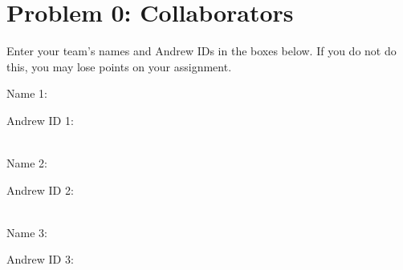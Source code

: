 \documentclass[12pt]{article}
\begin{document}
\section*{Problem 0: Collaborators}
Enter your team's names and Andrew IDs in the boxes below.  If you do not do this, you may lose points on your assignment.

Name 1: \begin{tcolorbox}[fit,height=1cm, width=5cm, blank, borderline={1pt}{1pt},nobeforeafter]
    \begin{center}
    \vspace{3mm}
    \large{}
    \end{center}
\end{tcolorbox}
Andrew ID 1: \begin{tcolorbox}[fit,height=1cm, width=5cm, blank, borderline={1pt}{1pt},nobeforeafter]
    \begin{center}
    \vspace{3mm}
    \large{}
    \end{center}
\end{tcolorbox}
    \\
Name 2: \begin{tcolorbox}[fit,height=1cm, width=5cm, blank, borderline={1pt}{1pt},nobeforeafter]
    \begin{center}
    \vspace{3mm}
    \large{}
    \end{center}
\end{tcolorbox}
Andrew ID 2: \begin{tcolorbox}[fit,height=1cm, width=5cm, blank, borderline={1pt}{1pt},nobeforeafter]
    \begin{center}
    \vspace{3mm}
    \large{}
    \end{center}
\end{tcolorbox} \\
Name 3: \begin{tcolorbox}[fit,height=1cm, width=5cm, blank, borderline={1pt}{1pt},nobeforeafter]
    \begin{center}
    \vspace{3mm}
    \large{}
    \end{center}
\end{tcolorbox}
Andrew ID 3: \begin{tcolorbox}[fit,height=1cm, width=5cm, blank, borderline={1pt}{1pt},nobeforeafter]
    \begin{center}
    \vspace{3mm}
    \large{}
    \end{center}
\end{tcolorbox} \\
\vspace{0.5cm}
\vspace{0.5cm}
\end{document}
